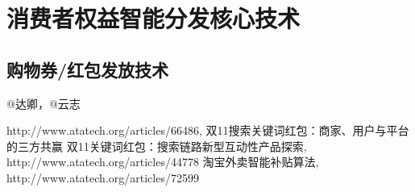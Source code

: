 
\chapter{消费者权益智能分发核心技术}
\thispagestyle{empty}

\setlength{\fboxrule}{0pt}\setlength{\fboxsep}{0cm}
\noindent\shadowbox{
\begin{tcolorbox}[arc=0mm,colback=lightblue,colframe=darkblue,title=学习目标与要求]

\end{tcolorbox}}
\setlength{\fboxrule}{1pt}\setlength{\fboxsep}{4pt} 


\section{购物券/红包发放技术} 
	@达卿，@云志



\begin{thebibliography}{99}
 http://www.atatech.org/articles/66486, 双11搜索关键词红包：商家、用户与平台的三方共赢
 双11关键词红包：搜索链路新型互动性产品探索, http://www.atatech.org/articles/44778
 淘宝外卖智能补贴算法, http://www.atatech.org/articles/72599 

\end{thebibliography}

 
